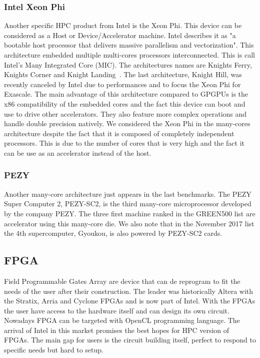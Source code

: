 \subsubsection{Intel Xeon Phi}
Another specific HPC product from Intel is the Xeon Phi. 
This device can be considered as a Host or Device/Accelerator machine. 
Intel describes it as "a bootable host processor that delivers massive parallelism and vectorization".
This architecture embedded multiple multi-cores processors interconnected. 
This is call Intel's Many Integrated Core (MIC).
The architectures names are Knights Ferry, Knights Corner and Knight Landing~\cite{sodani2016knights}. 
The last architecture, Knight Hill, was recently canceled by Intel due to performances and to focus the Xeon Phi for Exascale.
The main advantage of this architecture compared to GPGPUs is the x86 compatibility of the embedded cores and the fact this device can boot and use to drive other accelerators. 
They also feature more complex operations and handle double precision natively.
We considered the Xeon Phi in the many-cores architecture despite the fact that it is composed of completely independent processors. 
This is due to the number of cores that is very high and the fact it can be use as an accelerator instead of the host.  


\subsubsection{PEZY}
Another many-core architecture just appears in the last benchmarks. 
The PEZY Super Computer 2, PEZY-SC2, is the third many-core microprocessor developed by the company PEZY. 
The three first machine ranked in the GREEN500 list are accelerator using this many-core die. 
We also note that in the November 2017 list the 4th supercomputer, Gyoukou, is also powered by PEZY-SC2 cards.

\subsection{FPGA}
Field Programmable Gates Array are device that can de reprogram to fit the needs of the user after their construction.
The leader was historically Altera with the Stratix, Arria and Cyclone FPGAs and is now part of Intel. 
With the FPGAs the user have access to the hardware itself and can design its own circuit. 
Nowadays FPGA can be targeted with OpenCL programming language. 
The arrival of Intel in this market promises the best hopes for HPC version of FPGAs. 
The main gap for users is the circuit building itself, perfect to respond to specific needs but hard to setup. 

